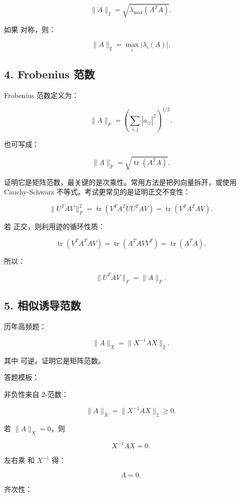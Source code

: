 \documentclass[11pt,a4paper]{ctexart}
\newcommand{\code}[1]{\begingroup\ttfamily\small #1\endgroup}
\begin{document}
\[
\|A\|_2=\sqrt{\lambda_{\max}(A^TA)}.
\]

如果 \code{} 对称，则：

\[
\|A\|_2=\max_i |\lambda_i(A)|.
\]


\subsection*{4. Frobenius 范数}


Frobenius 范数定义为：

\[
\|A\|_F=\left(\sum_{i,j}|a_{ij}|^2\right)^{1/2}.
\]

也可写成：

\[
\|A\|_F=\sqrt{\operatorname{tr}(A^TA)}.
\]

证明它是矩阵范数，最关键的是次乘性。常用方法是把列向量拆开，或使用 Cauchy-Schwarz 不等式。考试更常见的是证明正交不变性：

\[
\|U^TAV\|_F^2
=\operatorname{tr}(V^TA^TUU^TAV)
=\operatorname{tr}(V^TA^TAV).
\]

若 \code{} 正交，则利用迹的循环性质：

\[
\operatorname{tr}(V^TA^TAV)=\operatorname{tr}(A^TAVV^T)=\operatorname{tr}(A^TA).
\]

所以：

\[
\|U^TAV\|_F=\|A\|_F.
\]


\subsection*{5. 相似诱导范数}


历年高频题：

\[
\|A\|_X=\|X^{-1}AX\|_2.
\]

其中 \code{} 可逆。证明它是矩阵范数。

答题模板：

非负性来自 2-范数：

\[
\|A\|_X=\|X^{-1}AX\|_2\ge 0.
\]

若 $\|A\|_X=0$，则

\[
X^{-1}AX=0.
\]

左右乘 \code{} 和 $X^{-1}$ 得：

\[
A=0.
\]

齐次性：
\end{document}
